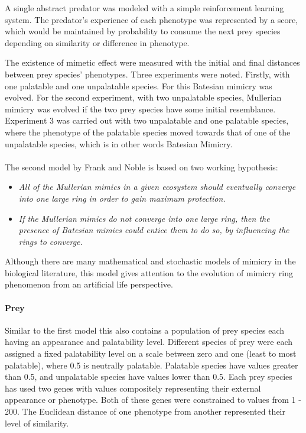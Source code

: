 A single abstract predator was modeled with a simple reinforcement learning system. The predator's experience of each phenotype was represented by a score, which would be maintained by probability to consume the next prey species depending on similarity or difference in phenotype. 

The existence of mimetic effect were measured with the initial and final distances between prey species' phenotypes. Three experiments were noted. Firstly, with one palatable and one unpalatable species. For this Batesian mimicry was evolved. For the second experiment, with two unpalatable species, Mullerian mimicry was evolved if the two prey species have some initial resemblance. Experiment 3 was carried out with two unpalatable and one palatable species, where the phenotype of the palatable species moved towards that of one of the unpalatable species, which is in other words Batesian Mimicry.

\paragraph{}
The second model by Frank and Noble \cite{franks2003} is based on two working hypothesis:

\begin{itemize}
	\item \textsl{All of the Mullerian mimics in a given ecosystem should eventually converge into one large ring in order to gain maximum protection.}
	\item \textsl{If the Mullerian mimics do not converge into one large ring, then the presence of Batesian mimics could entice them to do so, by influencing the rings to converge.}
\end{itemize}

Although there are many mathematical and stochastic models of mimicry in the biological literature, this model gives attention to the evolution of mimicry ring phenomenon from an artificial life perspective.

\paragraph{Prey}
Similar to the first model this also contains a population of prey species each having an appearance and palatability level. Different species of prey were each assigned a fixed palatability level on a scale between zero and one (least to most palatable), where 0.5 is neutrally palatable. Palatable species have values greater than 0.5, and unpalatable species have values lower than 0.5. Each prey species has used two genes with values compositely representing their external appearance or phenotype. Both of these genes were constrained to values from 1 - 200. The Euclidean distance of one phenotype from another represented their level of similarity.

